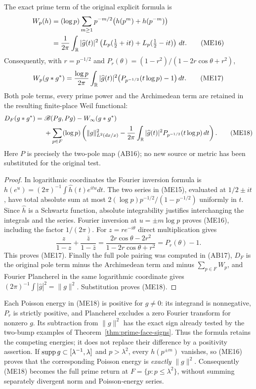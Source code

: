 \begin{theorem}
\label{thm:ME-Weil-prime}
The exact prime term of the original explicit formula is
\begin{align}
 W_p(h)&=(\log p)\sum_{m\ge1}p^{-m/2}
       \bigl(h(p^m)+h(p^{-m})\bigr)\notag\\
 &=\frac1{2\pi}\int_\mathbb R |\widehat g(t)|^2
 \left(L_p(\tfrac12+it)+L_p(\tfrac12-it)\right)\,dt.
 \tag{ME16}\label{eq:ME-Weil-prime}
\end{align}
Consequently, with $r=p^{-1/2}$ and
$P_r(\theta)=(1-r^2)/(1-2r\cos\theta+r^2)$,
\[
 W_p(g*g^*)=\frac{\log p}{2\pi}\int_\mathbb R
 |\widehat g(t)|^2\bigl(P_{p^{-1/2}}(t\log p)-1\bigr)\,dt.
 \tag{ME17}\label{eq:ME-poisson}
\]
Both pole terms, every prime power and the Archimedean term are retained
in the resulting finite-place Weil functional:
\begin{align}
 D_F(g*g^*)={}&\mathscr B(Pg,Pg)-W_\infty(g*g^*)\notag\\
 &+\sum_{p\in F}(\log p)\left(
 \|g\|_{L^2(dx/x)}^2-
 \frac1{2\pi}\int_\mathbb R|\widehat g(t)|^2
 P_{p^{-1/2}}(t\log p)\,dt\right).
 \tag{ME18}\label{eq:ME-complete-prime-receiver}
\end{align}
Here $P$ is precisely the two-pole map (AB16); no new source or metric
has been substituted for the original test.
\end{theorem}
\begin{proof}
In logarithmic coordinates the Fourier inversion formula is
$h(e^u)=(2\pi)^{-1}\int\widehat h(t)e^{itu}dt$.
The two series in (ME15), evaluated at $1/2\pm it$, have total absolute
sum at most $2(\log p)p^{-1/2}/(1-p^{-1/2})$ uniformly in $t$.
Since $\widehat h$ is a Schwartz function, absolute integrability justifies
interchanging the integrals and the series. Fourier inversion at
$u=\pm m\log p$ proves (ME16), including the factor $1/(2\pi)$.
For $z=re^{-i\theta}$ direct multiplication gives
\[
 \frac{z}{1-z}+\frac{\bar z}{1-\bar z}
 =\frac{2r\cos\theta-2r^2}{1-2r\cos\theta+r^2}
 =P_r(\theta)-1.
 \tag{ME19}
\]
This proves (ME17). Finally the full pole pairing was computed in (AB17),
$D_F$ is the original pole term minus the Archimedean term and minus
$\sum_{p\in F}W_p$, and Fourier Plancherel in the same logarithmic
coordinate gives $(2\pi)^{-1}\int|\widehat g|^2=\|g\|^2$.
Substitution proves (ME18).
\end{proof}

Each Poisson energy in (ME18) is positive for $g\ne0$: its integrand is
nonnegative, $P_r$ is strictly positive, and Plancherel excludes a zero
Fourier transform for nonzero $g$. Its subtraction from $\|g\|^2$ has
the exact sign already tested by the two-bump examples of
Theorem~\ref{thm:prime-face-signs}. Thus the formula retains the
competing energies; it does not replace their difference by a positivity
assertion. If $\operatorname{supp} g\subset[\lambda^{-1},\lambda]$ and
$p>\lambda^2$, every $h(p^{\pm m})$ vanishes, so (ME16) proves that
the corresponding Poisson energy is \emph{exactly} $\|g\|^2$.
Consequently (ME18) becomes the full prime return at
$F=\{p:p\le\lambda^2\}$, without summing separately divergent
norm and Poisson-energy series.

